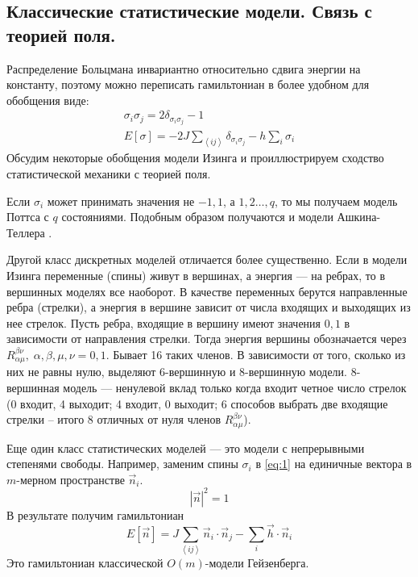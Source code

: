 \documentclass[a4paper,12pt]{article}
\theoremstyle{definition}
\theoremstyle{definition}
\theoremstyle{definition}
\begin{document}
\subsection{Классические статистические модели. Связь с теорией поля.}
\label{sec:statistical-models-qft}

Распределение Больцмана инвариантно относительно сдвига энергии на константу, поэтому можно
переписать гамильтониан в более удобном для обобщения виде:
\begin{equation}
  \label{eq:12}
  \begin{array}{l}
    \sigma_i\sigma_j=2\delta_{\sigma_i\sigma_j}-1\\
    E[\sigma]=-2J\sum_{\left<ij\right>}\delta_{\sigma_i\sigma_j}-h\sum_i \sigma_i
  \end{array}
\end{equation}
Обсудим некоторые обобщения модели Изинга и проиллюстрируем сходство статистической механики с теорией поля.

Если $\sigma_i$ может принимать значения не $-1,1$, а $1,2\dots,q$, то мы получаем модель Поттса с $q$ состояниями.
Подобным образом получаются и модели Ашкина-Теллера \cite{difrancesco1997cft}.

Другой класс дискретных моделей отличается более существенно. Если в модели Изинга переменные
(спины) живут в вершинах, а энергия --- на ребрах, то в вершинных моделях все наоборот. В качестве
переменных берутся направленные ребра (стрелки), а энергия в вершине зависит от числа входящих и
выходящих из нее стрелок. Пусть ребра, входящие в вершину имеют значения $0,1$ в зависимости от
направления стрелки. Тогда энергия вершины обозначается через $R_{\alpha\mu}^{\beta\nu},\;
\alpha,\beta,\mu,\nu=0,1$. Бывает 16 таких членов. В зависимости от того, сколько из них не равны
нулю, выделяют 6-вершинную и 8-вершинную модели. 8-вершинная модель --- ненулевой вклад только когда
входит четное число стрелок (0 входит, 4 выходит; 4 входит, 0 выходит; 6 способов выбрать две
входящие стрелки -- итого 8 отличных от нуля членов $R_{\alpha\mu}^{\beta\nu}$).

Еще один класс статистических моделей --- это модели с непрерывными степенями свободы. Например,
заменим спины $\sigma_i$ в \eqref{eq:1} на единичные вектора в $m$-мерном пространстве $\vec n_i$.
\begin{equation}
  \label{eq:14}
  \left|\vec n\right|^2=1
\end{equation}
В результате получим гамильтониан
\begin{equation}
  \label{eq:13}
  E[\vec n]=J\sum_{\left<ij\right>}\vec n_i\cdot \vec n_j-\sum_i \vec h\cdot \vec n_i
\end{equation}
Это гамильтониан классической $O(m)$-модели Гейзенберга. 
\end{document}
